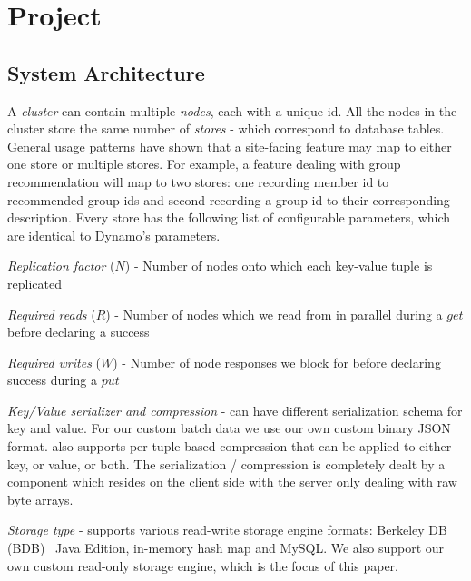 \section{Project \projectname{}}

\subsection{System Architecture}
\label{sec:system_architecture}

A \projectname{} \emph{cluster} can contain multiple \emph{nodes}, each with a unique id. All the nodes in the cluster store the same number of \emph{stores} - which correspond to database tables. General usage patterns have shown that a site-facing feature may map to either one store or multiple stores. For example, a feature dealing with group recommendation will map to two stores: one recording member id to recommended group ids and second recording a group id to their corresponding description. Every store has the following list of configurable parameters, which are identical to Dynamo's parameters. 
\begin{compactitem}
	\item \emph {Replication factor} ($N$) - Number of nodes onto which each key-value tuple is replicated
	\item \emph {Required reads} ($R$) - Number of nodes which we read from in parallel during a $get$ before declaring a success
	\item \emph {Required writes} ($W$) - Number of node responses we block for before declaring success during a $put$
	\item \emph {Key/Value serializer and compression} - \projectname{} can have different serialization schema for key and value. For our custom batch data we use our own custom binary JSON format. \projectname{} also supports per-tuple based compression that can be applied to either key, or value, or both. The serialization / compression is completely dealt by a component which resides on the client side with the server only dealing with raw byte arrays. 
	\item \emph {Storage type} - \projectname{} supports various read-write storage engine formats: Berkeley DB (BDB)~\cite{bdb} Java Edition, in-memory hash map and MySQL. We also support our own custom read-only storage engine, which is the focus of this paper.  
\end{compactitem}

